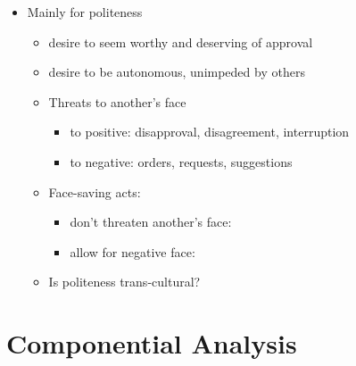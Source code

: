 \documentclass[headrule,footrule]{foils}
\begin{document}

\begin{itemize}
\item Mainly for politeness
\begin{itemize}
\item {} desire to seem worthy and deserving of approval
\item {} desire to be autonomous, unimpeded by others
\item Threats to another’s face
  \begin{itemize}
  \item to positive: disapproval, disagreement, interruption
  \item to negative: orders, requests, suggestions
  \end{itemize}
\item Face-saving acts: 
  \begin{itemize}
  \item don't threaten another’s face: 
  \item allow for negative face: 
  \end{itemize}
\item Is politeness trans-cultural?
\end{itemize}
\end{itemize}


\section{Componential Analysis}
\end{document}
